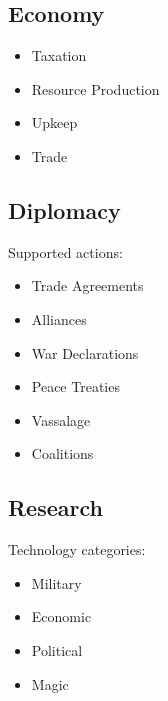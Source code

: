 \documentclass[11pt,a4paper]{article}
\begin{document}
\subsection{Economy}

\begin{itemize}

    \item Taxation

    \item Resource Production

    \item Upkeep

    \item Trade

\end{itemize}

\subsection{Diplomacy}

Supported actions:

\begin{itemize}

    \item Trade Agreements

    \item Alliances

    \item War Declarations

    \item Peace Treaties

    \item Vassalage

    \item Coalitions

\end{itemize}

\subsection{Research}

Technology categories:

\begin{itemize}

    \item Military

    \item Economic

    \item Political

    \item Magic

\end{itemize}
\end{document}
